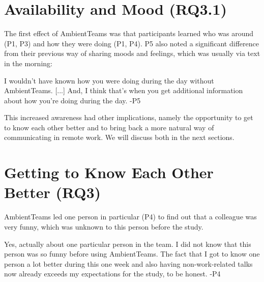 

\section{Availability and Mood (RQ3.1)}
The first effect of AmbientTeams was that participants learned who was around (P1, P3) and how they were doing (P1, P4). P5 also noted a significant difference from their previous way of sharing moods and feelings, which was usually via text in the morning:


\begin{displayquote}[][]
    [...] I wouldn't have known how you were doing during the day without AmbientTeams. [...] And, I think that's when you get additional information about how you're doing during the day. -P5
\end{displayquote}

This increased awareness had other implications, namely the opportunity to get to know each other better and to bring back a more natural way of communicating in remote work. We will discuss both in the next sections.

\section{Getting to Know Each Other Better (RQ3)}
AmbientTeams led one person in particular (P4) to find out that a colleague was very funny, which was unknown to this person before the study.

\begin{displayquote}
    Yes, actually about one particular person in the team. I did not know that this person was so funny before using AmbientTeams. The fact that I got to know one person a lot better during this one week and also having non-work-related talks now already exceeds my expectations for the study, to be honest. -P4
\end{displayquote}

